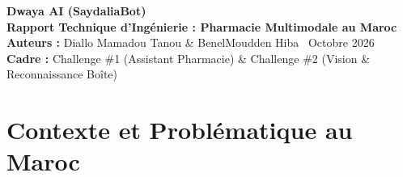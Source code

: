 \documentclass[a4paper,10pt]{article}
\begin{document}
\begin{tcolorbox}[colback=primary,colframe=primary,arc=2mm,left=6mm,right=6mm,top=5mm,bottom=5mm]
    \color{white}
    {\Huge \textbf{Dwaya AI (SaydaliaBot)}} \\[2mm]
    {\Large \textbf{Rapport Technique d'Ingénierie : Pharmacie Multimodale au Maroc}} \\[3mm]
    \footnotesize
    \textbf{Auteurs :} Diallo Mamadou Tanou \& BenelMoudden Hiba \hfill \faCalendar*~Octobre 2026 \\
    \textbf{Cadre :} Challenge \#1 (Assistant Pharmacie) \& Challenge \#2 (Vision \& Reconnaissance Boîte)
\end{tcolorbox}

\vspace{0.4cm}

\begin{abstract}
\noindent Ce rapport documente l'architecture, la conception algorithmique et l'implémentation industrielle de \textbf{Dwaya AI}, un système d'orientation pharmaceutique multimodal conçu pour le contexte marocain. La solution combine l'intelligence générative de \textbf{Google Gemini 3.5 Flash} (traitement natif de la Darija marocaine orale et écrite en Arabizi) avec le grounding strict du \textbf{catalogue officiel CNOPS} (5 918 médicaments) et la géolocalisation de \textbf{800 officines}. Pour la reconnaissance de boîtes (Challenge \#2), un pipeline autonome de vision par ordinateur (redressement Hough, filtre CLAHE, deep learning \textbf{RapidOCR ONNX}) est intégré sur CPU sans dépendance système. Le système résout le défi de l'absence d'API de stock centralisée au Maroc grâce à des passerelles d'action directe (\textbf{WhatsApp prérempli en 1 clic} et appel téléphonique natif), tout en garantissant une étanchéité médicale via des garde-fous d'urgence vitale SAMU 141 / 15. L'ensemble est validé par une suite de \textbf{37 tests automatisés réussis à 100\%}.
\end{abstract}

\vspace{0.2cm}

\section{Contexte et Problématique au Maroc}
\end{document}
